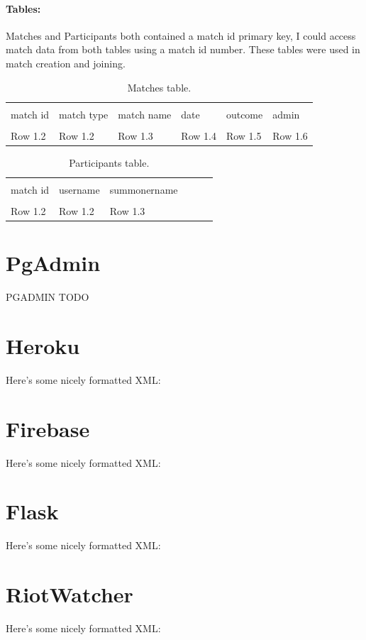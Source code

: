 \paragraph{Tables:}Matches and Participants both contained a match id primary key, I could access match data from both tables using a match id number. These tables were used in match creation and joining.
\begin{table}[h]
	\centering
	\begin{tabular}{llllll}
		\toprule \\
		match id & match type & match name & date & outcome & admin \\
		\midrule \\
		Row 1.2  & Row 1.2    & Row 1.3    & Row 1.4 & Row 1.5 & Row 1.6\\
		\bottomrule
	\end{tabular}
	\caption{Matches table.}
	\label{table:Matches}
\end{table}
\begin{table}[h]
	\centering
	\begin{tabular}{llllll}
		\toprule \\
		match id & username & summonername \\
		\midrule \\
		Row 1.2  & Row 1.2  & Row 1.3  \\
		\bottomrule
	\end{tabular}
	\caption{Participants table.}
	\label{table:Matches}
\end{table}
\section{PgAdmin}
PGADMIN TODO
\section{Heroku}
Here's some nicely formatted XML:
\section{Firebase}
Here's some nicely formatted XML:
\section{Flask}
Here's some nicely formatted XML:
\section{RiotWatcher}
Here's some nicely formatted XML:
